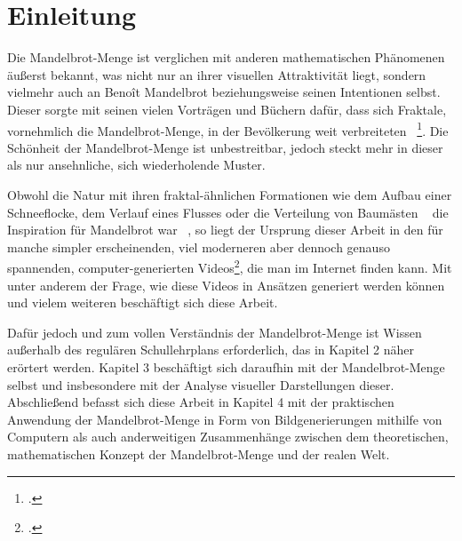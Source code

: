 \section{Einleitung}\label{sec:introduction}

Die Mandelbrot-Menge ist verglichen mit anderen mathematischen Phänomenen
äußerst bekannt, was nicht nur an ihrer visuellen Attraktivität liegt,
sondern vielmehr auch an Benoît Mandelbrot beziehungsweise seinen Intentionen selbst.
Dieser sorgte mit seinen vielen Vorträgen und Büchern dafür, dass sich Fraktale,
vornehmlich die Mandelbrot-Menge, in der Bevölkerung weit verbreiteten
~\footcite[Vgl. letzten Absatz]{ibm_fractal_2011}.
Die Schönheit der Mandelbrot-Menge ist unbestreitbar, jedoch steckt mehr in dieser
als nur ansehnliche, sich wiederholende Muster.

Obwohl die Natur mit ihren fraktal-ähnlichen Formationen wie dem Aufbau einer
Schneeflocke, dem Verlauf eines Flusses oder die Verteilung von Baumästen
~\cite{nnart_fractals_nodate} die Inspiration für Mandelbrot war
~\cite{zink_kosmische_2014}, so liegt der Ursprung dieser Arbeit in den für
manche simpler erscheinenden, viel moderneren aber dennoch genauso spannenden,
computer-generierten Videos\footcite[Vgl. bspw.][]{maths_town_eye_2017},
die man im Internet finden kann.
Mit unter anderem der Frage, wie diese Videos in Ansätzen generiert werden können
und vielem weiteren beschäftigt sich diese Arbeit.

Dafür jedoch und zum vollen Verständnis der Mandelbrot-Menge ist Wissen außerhalb
des regulären Schullehrplans erforderlich, das in Kapitel 2 näher erörtert werden.
Kapitel 3 beschäftigt sich daraufhin mit der Mandelbrot-Menge selbst und insbesondere
mit der Analyse visueller Darstellungen dieser.
Abschließend befasst sich diese Arbeit in Kapitel 4 mit der praktischen Anwendung
der Mandelbrot-Menge in Form von Bildgenerierungen mithilfe von Computern als auch
anderweitigen Zusammenhänge zwischen dem theoretischen, mathematischen Konzept
der Mandelbrot-Menge und der realen Welt.